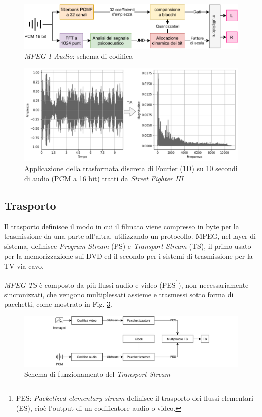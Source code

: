 \begin{figure}[H]
	\includegraphics[width=\linewidth]{immagini/mpegaudio}
	\caption{\textit{MPEG-1 Audio}: schema di codifica}
	\label{fig:mpegaudio}
\end{figure}

\begin{figure}[H]
	\includegraphics[width=\linewidth]{immagini/FFT}
	\caption{Applicazione della trasformata discreta di Fourier (1D) su 10 secondi di audio (PCM a 16 bit) tratti da \textit{Street Fighter III}}
	\label{fig:FFT}
\end{figure}



\subsection{Trasporto}
Il trasporto definisce il modo in cui il filmato viene compresso in byte per la trasmissione da una parte all'altra, utilizzando un protocollo. MPEG, nel layer di sistema, definisce \textit{Program Stream} (PS) e \textit{Transport Stream} (TS), il primo usato per la memorizzazione sui DVD ed il secondo per i sistemi di trasmissione per la TV via cavo. 

\textit{MPEG-TS} è composto da più flussi audio e video (PES\footnote{PES: \textit{Packetized elementary stream} definisce il trasporto dei flussi elementari (ES), cioè l'output di un codificatore audio o video.}), non necessariamente sincronizzati, che vengono multiplessati assieme e trasmessi sotto forma di pacchetti, come mostrato in Fig. \ref{fig:MPEGTS}.

\begin{figure}[H]
	\includegraphics[width=\linewidth]{immagini/MPEGTS}
	\caption{Schema di funzionamento del \textit{Transport Stream}}
	\label{fig:MPEGTS}
\end{figure}

